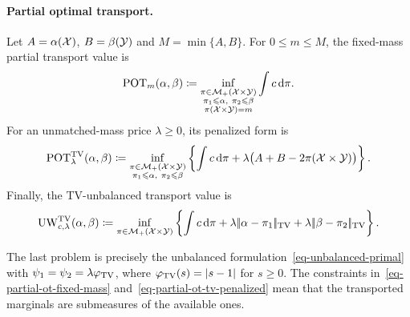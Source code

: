 \paragraph{Partial optimal transport.}
\begin{defn}\label{def-partial-optimal-transport}
Let $A=\alpha(\mathcal{X})$, $B=\beta(\mathcal{Y})$ and $M=\min\{A,B\}$. For $0\leq m\leq M$, the fixed-mass partial transport value is
\begin{equation}\label{eq-partial-ot-fixed-mass}
\operatorname{POT}_m(\alpha,\beta)
\coloneqq
\inf_{\substack{\pi\in\mathcal{M}_+(\mathcal{X}\times\mathcal{Y})\\
\pi_1\leqslant\alpha,\ \pi_2\leqslant\beta\\
\pi(\mathcal{X}\times\mathcal{Y})=m}}
\int c\,\mathrm{d}\pi.
\end{equation}
For an unmatched-mass price $\lambda\geq0$, its penalized form is
\begin{equation}\label{eq-partial-ot-tv-penalized}
\operatorname{POT}^{\operatorname{TV}}_\lambda(\alpha,\beta)
\coloneqq
\inf_{\substack{\pi\in\mathcal{M}_+(\mathcal{X}\times\mathcal{Y})\\
\pi_1\leqslant\alpha,\ \pi_2\leqslant\beta}}
\left\{
\int c\,\mathrm{d}\pi
+\lambda\bigl(A+B-2\pi(\mathcal{X}\times\mathcal{Y})\bigr)
\right\}.
\end{equation}
Finally, the TV-unbalanced transport value is
\begin{equation}\label{eq-partial-ot-tv-unbalanced}
\operatorname{UW}_{c,\lambda}^{\operatorname{TV}}(\alpha,\beta)
\coloneqq
\inf_{\pi\in\mathcal{M}_+(\mathcal{X}\times\mathcal{Y})}
\left\{
\int c\,\mathrm{d}\pi
+\lambda|\!| \alpha-\pi_1 |\!|_{\operatorname{TV}}
+\lambda|\!| \beta-\pi_2 |\!|_{\operatorname{TV}}
\right\}.
\end{equation}
\end{defn}
The last problem is precisely the unbalanced formulation~\eqref{eq-unbalanced-primal} with $\psi_1=\psi_2=\lambda\varphi_{\operatorname{TV}}$, where $\varphi_{\operatorname{TV}}(s)=|s-1|$ for $s\geq0$. The constraints in~\eqref{eq-partial-ot-fixed-mass} and~\eqref{eq-partial-ot-tv-penalized} mean that the transported marginals are submeasures of the available ones.

